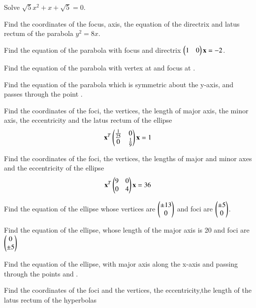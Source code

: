 \item Solve $\sqrt{5}x^2+ x+\sqrt{5} = 0 $.
%
\item Find the coordinates of the focus, axis, the equation of the directrix and latus rectum of the parabola $y^2 = 8x$.
%
\item Find the equation of the parabola with focus  and directrix $\begin{pmatrix}1 & 0\end{pmatrix}\mathbf{x} = -2$.\item Find the equation of the parabola with vertex at  and focus at .
\\
\solution


\item Find the equation of the parabola which is symmetric about the y-axis, and passes through the point .
\item Find the coordinates of the foci, the vertices, the length of major axis, the minor axis, the eccentricity and the latus rectum of the ellipse 
%
\begin{align}
\mathbf{x}^T\begin{pmatrix}\frac{1}{25} & 0 \\ 0 & \frac{1}{9}\end{pmatrix}\mathbf{x} = 1
\end{align}
%
\item Find the coordinates of the foci, the vertices, the lengths of major and minor axes and the eccentricity of the ellipse 
%
\begin{align}
\mathbf{x}^T\begin{pmatrix}9 & 0 \\ 0 & 4\end{pmatrix}\mathbf{x} = 36
\end{align}
%
\item Find the equation of the ellipse whose vertices are $\begin{pmatrix}\pm 13\\ 0\end{pmatrix}$ and foci are $\begin{pmatrix}\pm 5\\ 0\end{pmatrix}$.
%
\item Find the equation of the ellipse, whose length of the major axis is 20 and foci are $\begin{pmatrix}0\\ \pm 5\end{pmatrix}$
%
\item Find the equation of the ellipse, with major axis along the x-axis and passing through the points  and .
\\
\solution

%
\item Find the coordinates of the foci and the vertices, the eccentricity,the length of the latus rectum of the hyperbolas
